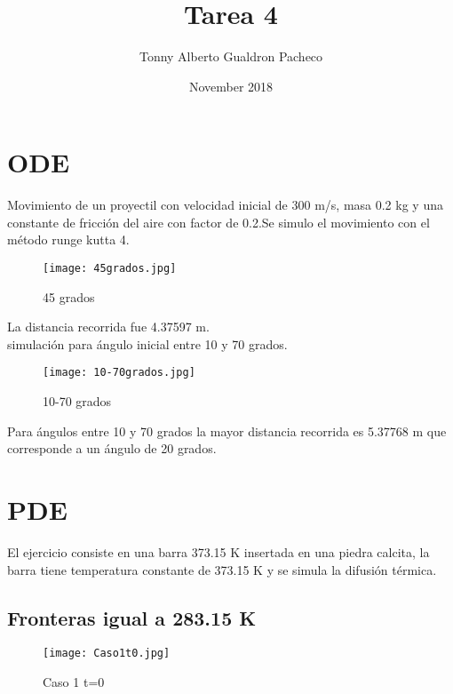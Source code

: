 \documentclass{article}
\title{Tarea 4}
\author{Tonny Alberto Gualdron Pacheco}
\date{November 2018}
\begin{document}
\maketitle

\section{ODE}

Movimiento de un proyectil con velocidad inicial de 300 m/s, masa 0.2 kg y una constante de fricción del aire con factor de 0.2.Se simulo el movimiento con el método runge kutta 4.\\

\begin{figure}[h!]
\centering
\texttt{[image: 45grados.jpg]}
\caption{45 grados}
\label{fig:45}
\end{figure}

La distancia recorrida fue 4.37597 m.\\

simulación para ángulo inicial entre 10 y 70 grados.\\

\begin{figure}[h!]
\centering
\texttt{[image: 10-70grados.jpg]}
\caption{10-70 grados}
\label{fig:10-70}
\end{figure}

Para ángulos entre 10 y 70 grados la mayor distancia recorrida es 5.37768 m que corresponde a un ángulo de 20 grados.\\

\clearpage

\section{PDE}

El ejercicio consiste en una barra 373.15 K insertada en una piedra calcita, la barra tiene temperatura constante de 373.15 K y se simula la difusión térmica.\\ 

\subsection{Fronteras igual a 283.15 K}

\begin{figure}[h!]
\centering
\texttt{[image: Caso1t0.jpg]}
\caption{Caso 1 t=0}
\label{fig:1}
\end{figure}
\end{document}
